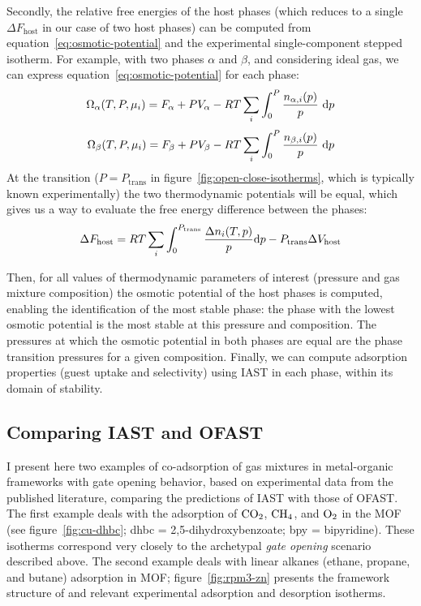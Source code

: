 \documentclass[thesis]{subfiles}
\begin{document}
Secondly, the relative free energies of the host phases (which reduces to a
single $\Delta F_\text{host}$ in our case of two host phases) can be computed
from equation~\eqref{eq:osmotic-potential} and the experimental single-component
stepped isotherm. For example, with two phases $\alpha$ and $\beta$, and
considering ideal gas, we can express equation~\eqref{eq:osmotic-potential} for
each phase:
\[\Omega_\alpha(T, P, \mu_i) = F_\alpha + P V_\alpha - RT \sum_i \int_0^P \frac{n_{\alpha, i}(p)}{p} \ \d p\]
\[\Omega_\beta(T, P, \mu_i) = F_\beta + P V_\beta - RT \sum_i \int_0^P \frac{n_{\beta, i}(p)}{p} \ \text{d} p\]
At the transition ($P=P_\text{trans}$ in figure~\ref{fig:open-close-isotherms},
which is typically known experimentally) the two thermodynamic potentials will
be equal, which gives us a way to evaluate the free energy difference between
the phases:
\[ \label{eq:ofast:delta-f}\Delta F_\text{host} = RT \sum_i \int_0^{P_\text{trans}} \frac{\Delta n_i(T, p)}{p} \text{d} p - P_\text{trans} \Delta V_\text{host}\]

Then, for all values of thermodynamic parameters of interest (pressure and gas
mixture composition) the osmotic potential of the host phases is computed,
enabling the identification of the most stable phase: the phase with the lowest
osmotic potential is the most stable at this pressure and composition. The
pressures at which the osmotic potential in both phases are equal are the phase
transition pressures for a given composition. Finally, we can compute adsorption
properties (guest uptake and selectivity) using IAST in each phase, within its
domain of stability.

\newpage
\subsection{Comparing IAST and OFAST}

I present here two examples of co-adsorption of gas mixtures in metal-organic
frameworks with gate opening behavior, based on experimental data from the
published literature, comparing the predictions of IAST with those of OFAST. The
first example deals with the adsorption of $\ce{CO2}$, $\ce{CH4}$, and $\ce{O2}$
in the \Cudhbc MOF\cite{Kitaura2003} (see figure~\ref{fig:cu-dhbc}; dhbc =
2,5-dihydroxybenzoate; bpy = bipyridine). These isotherms correspond very
closely to the archetypal \emph{gate opening} scenario described above. The
second example deals with linear alkanes (ethane, propane, and butane)
adsorption in \RPMZn MOF\cite{Nijem2012}; figure~\ref{fig:rpm3-zn} presents the
framework structure of \RPMZn and relevant experimental adsorption and
desorption isotherms.
\end{document}
